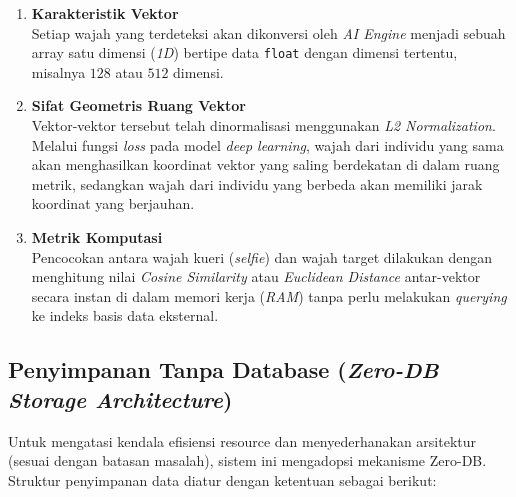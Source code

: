 \begin{enumerate}
    \item \textbf{Karakteristik Vektor}  \\
    Setiap wajah yang terdeteksi akan dikonversi oleh \textit{AI Engine} menjadi sebuah array satu dimensi (\textit{1D}) bertipe data \texttt{float} dengan dimensi tertentu, misalnya $128$ atau $512$ dimensi.

    \item \textbf{Sifat Geometris Ruang Vektor} \\
    Vektor-vektor tersebut telah dinormalisasi menggunakan \textit{L2 Normalization}. Melalui fungsi \textit{loss} pada model \textit{deep learning}, wajah dari individu yang sama akan menghasilkan koordinat vektor yang saling berdekatan di dalam ruang metrik, sedangkan wajah dari individu yang berbeda akan memiliki jarak koordinat yang berjauhan.

    \item \textbf{Metrik Komputasi} \\
    Pencocokan antara wajah kueri (\textit{selfie}) dan wajah target dilakukan dengan menghitung nilai \textit{Cosine Similarity} atau \textit{Euclidean Distance} antar-vektor secara instan di dalam memori kerja (\textit{RAM}) tanpa perlu melakukan \textit{querying} ke indeks basis data eksternal.
\end{enumerate}

\subsection{Penyimpanan Tanpa Database (\textit{Zero-DB Storage Architecture})}
Untuk mengatasi kendala efisiensi resource dan menyederhanakan arsitektur (sesuai dengan batasan masalah), sistem ini mengadopsi mekanisme Zero-DB. Struktur penyimpanan data diatur dengan ketentuan sebagai berikut:


